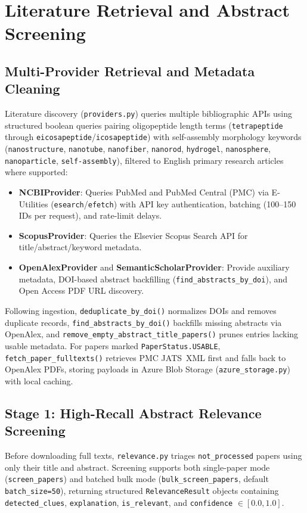\section{Literature Retrieval and Abstract Screening}
\label{sec:retrieval_screening}

\subsection{Multi-Provider Retrieval and Metadata Cleaning}
Literature discovery (\texttt{providers.py}) queries multiple bibliographic APIs using structured boolean queries pairing oligopeptide length terms (\texttt{tetrapeptide} through \texttt{eicosapeptide}/\texttt{icosapeptide}) with self-assembly morphology keywords (\texttt{nanostructure}, \texttt{nanotube}, \texttt{nanofiber}, \texttt{nanorod}, \texttt{hydrogel}, \texttt{nanosphere}, \texttt{nanoparticle}, \texttt{self-assembly}), filtered to English primary research articles where supported:
\begin{itemize}
    \item \textbf{NCBIProvider}: Queries PubMed and PubMed Central (PMC) via E-Utilities (\texttt{esearch}/\texttt{efetch}) with API key authentication, batching (100--150 IDs per request), and rate-limit delays.
    \item \textbf{ScopusProvider}: Queries the Elsevier Scopus Search API for title/abstract/keyword metadata.
    \item \textbf{OpenAlexProvider} and \textbf{SemanticScholarProvider}: Provide auxiliary metadata, DOI-based abstract backfilling (\texttt{find\_abstracts\_by\_doi}), and Open Access PDF URL discovery.
\end{itemize}
Following ingestion, \texttt{deduplicate\_by\_doi()} normalizes DOIs and removes duplicate records, \texttt{find\_abstracts\_by\_doi()} backfills missing abstracts via OpenAlex, and \texttt{remove\_empty\_abstract\_title\_papers()} prunes entries lacking usable metadata. For papers marked \texttt{PaperStatus.USABLE}, \texttt{fetch\_paper\_fulltexts()} retrieves PMC JATS~XML first and falls back to OpenAlex PDFs, storing payloads in Azure Blob Storage (\texttt{azure\_storage.py}) with local caching.

\subsection{Stage 1: High-Recall Abstract Relevance Screening}
Before downloading full texts, \texttt{relevance.py} triages \texttt{not\_processed} papers using only their title and abstract. Screening supports both single-paper mode (\texttt{screen\_papers}) and batched bulk mode (\texttt{bulk\_screen\_papers}, default \texttt{batch\_size=50}), returning structured \texttt{RelevanceResult} objects containing \texttt{detected\_clues}, \texttt{explanation}, \texttt{is\_relevant}, and \texttt{confidence} $\in [0.0, 1.0]$.

